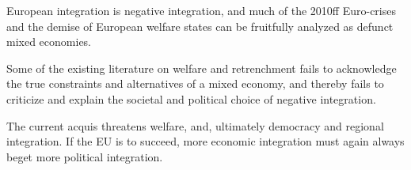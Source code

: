 \documentclass[11pt,a4paper,oneside,english]{article}
\begin{document}
European integration is negative integration, and much of the 2010ff Euro-crises and the demise of European welfare states can be fruitfully analyzed as defunct mixed economies.

Some of the existing literature on welfare and retrenchment fails to acknowledge the true constraints and alternatives of a mixed economy, and thereby fails to criticize and explain the societal and political choice of negative integration.

The current acquis threatens welfare, and, ultimately democracy and regional integration.
If the EU is to succeed, more economic integration must again always beget more political integration.






\end{document}
